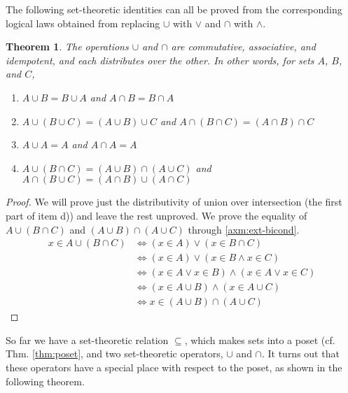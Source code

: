 \documentclass[12pt]{article}
\newcounter{thmc}
\newtheorem{thm}[thmc]{Theorem}
\begin{document}
The following set-theoretic identities can all be proved from the
corresponding logical laws obtained from replacing $\cup$ with $\vee$
and $\cap$ with $\wedge$.

\begin{thm}\label{thm:op}
  The operations $\cup$ and $\cap$ are commutative, associative, and
  idempotent, and each distributes over the other.  In other words,
  for sets $A$, $B$, and $C$,
  \begin{enumerate}[label=\alph*)]
  \item $A\cup B=B\cup A$ and $A\cap B=B\cap A$
  \item $A\cup (B\cup C)=(A\cup B)\cup C$ and $A\cap (B\cap C)=(A\cap B)\cap C$
  \item $A\cup A=A$ and $A\cap A=A$
  \item $A\cup(B\cap C)=(A\cup B)\cap(A\cup C)$ and $A\cap(B\cup C)=(A\cap
    B)\cup(A\cap C)$
  \end{enumerate}
\end{thm}

\begin{proof}
  We will prove just the distributivity of union over intersection
  (the first part of item d)) and leave the rest unproved.  We prove
  the equality of $A\cup(B\cap C)$ and $(A\cup B)\cap(A\cup C)$
  through \ref{axm:ext-bicond}.
  \begin{align*}
    x\in A\cup(B\cap C)
    &\Leftrightarrow (x\in A)\vee(x\in B\cap C) \\
    &\Leftrightarrow (x\in A)\vee(x\in B\wedge x\in C) \\
    &\Leftrightarrow (x\in A\vee x\in B)\wedge (x\in A\vee x\in C)\\
    &\Leftrightarrow (x\in A\cup B)\wedge (x\in A\cup C)\\
    &\Leftrightarrow x\in (A\cup B)\cap(A\cup C)
  \end{align*}
\end{proof}

So far we have a set-theoretic relation $\subseteq$, which makes sets
into a poset (cf. Thm. \ref{thm:poset}, and two set-theoretic
operators, $\cup$ and $\cap$.  It turns out that these operators have
a special place with respect to the poset, as shown in the following
theorem.
\end{document}
